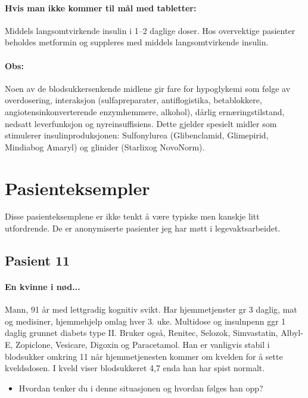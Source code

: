 					\paragraph{Hvis man ikke kommer til mål med tabletter:\\} Middels langsomtvirkende insulin i 1–2 daglige doser. Hos overvektige pasienter beholdes metformin og suppleres med middels langsomtvirkende insulin.

					\paragraph{Obs:\\}Noen av de blodsukkersenkende midlene gir fare for hypoglykemi som følge av overdosering, interaksjon (sulfapreparater, antiflogistika, betablokkere, angiotensinkonverterende enzymhemmere, alkohol), dårlig ernæringstilstand, nedsatt leverfunksjon og nyreinsuffisiens. Dette gjelder spesielt midler som stimulerer insulinproduksjonen: Sulfonylurea (Glibenclamid\textregistered, Glimepirid\textregistered, Mindiab\textregistered og Amaryl\textregistered) og glinider (Starlix\textregistered og NovoNorm\textregistered).
		\section{Pasienteksempler}
			Disse pasienteksemplene er ikke tenkt å være typiske men kanskje litt utfordrende. De er anonymiserte pasienter jeg har møtt i legevaktsarbeidet. 
			\subsection{Pasient 11}
				\paragraph{En kvinne i nød...\\}
					Mann, 91 år med lettgradig kognitiv svikt. Har hjemmetjenster gr 3 daglig, mat og medisiner, hjemmehjelp omlag hver 3. uke. Multidose og insulnpenn ggr 1 daglig grunnet diabets type II. Bruker også, Renitec, Selozok, Simvastatin, Albyl-E, Zopiclone, Vesicare, Digoxin og Paracetamol. Han er vanligvis stabil i blodsukker omkring 11 når hjemmetjenesten kommer om kvelden for å sette kveldsdosen. I kveld viser blodsukkeret 4,7 enda han har spist normalt.

					\begin{itemize}
						\item Hvordan tenker du i denne situasjonen og hvordan følges han opp?\\
					\end{itemize}

